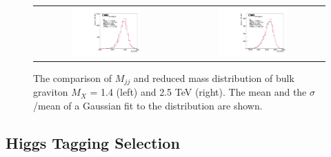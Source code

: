 \begin{figure}[t]
  \centering
  \begin{tabular}{cc}
    \includegraphics[width=0.5\textwidth]{Figures/red/1400.pdf} &
    \includegraphics[width=0.5\textwidth]{Figures/red/2500.pdf} \\
    
  \end{tabular}
  \caption{The comparison of $M_{jj}$ and reduced mass distribution of bulk graviton $M_X$ = 1.4 (left) and 2.5 TeV (right). The mean and the $\sigma $/mean of a Gaussian fit to the distribution are shown.}
  \label{fig:hvt_brs}
\end{figure}

\subsection{Higgs Tagging Selection} 

